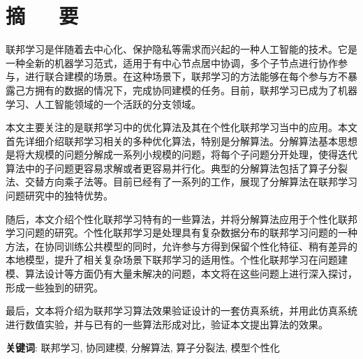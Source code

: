 \chapter*{摘~~~要}
\headheight=15.24pt%
\setcounter{page}{1}


联邦学习是伴随着去中心化、保护隐私等需求而兴起的一种人工智能的技术。它是一种全新的机器学习范式，适用于有中心节点居中协调，多个子节点进行协作参与，进行联合建模的场景。在这种场景下，联邦学习的方法能够在每个参与方不暴露己方拥有的数据的情况下，完成协同建模的任务。目前，联邦学习已成为了机器学习、人工智能领域的一个活跃的分支领域。

本文主要关注的是联邦学习中的优化算法及其在个性化联邦学习当中的应用。本文首先详细介绍联邦学习相关的多种优化算法，特别是分解算法。分解算法基本思想是将大规模的问题分解成一系列小规模的问题，将每个子问题分开处理，使得迭代算法中的子问题更容易求解或者更容易并行化。典型的分解算法包括了算子分裂法、交替方向乘子法等。目前已经有了一系列的工作，展现了分解算法在联邦学习问题研究中的独特优势。

随后，本文介绍个性化联邦学习特有的一些算法，并将分解算法应用于个性化联邦学习问题的研究。个性化联邦学习是处理具有复杂数据分布的联邦学习问题的一种方法，在协同训练公共模型的同时，允许参与方得到保留个性化特征、稍有差异的本地模型，提升了相关复杂场景下联邦学习的适用性。个性化联邦学习在问题建模、算法设计等方面仍有大量未解决的问题，本文将在这些问题上进行深入探讨，形成一些独到的研究。

最后，文本将介绍为联邦学习算法效果验证设计的一套仿真系统，并用此仿真系统进行数值实验，并与已有的一些算法形成对比，验证本文提出算法的效果。

\par
\bigskip

{\song \textbf{关键词}: 联邦学习, 协同建模, 分解算法, 算子分裂法, 模型个性化}

\newpage
~~~\vspace{1em}
\thispagestyle{empty}
